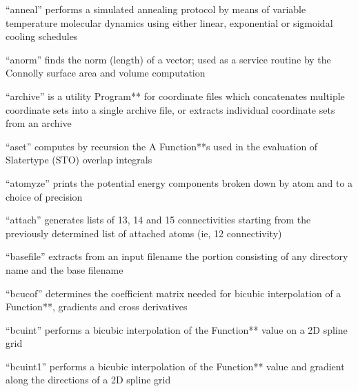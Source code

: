 \documentclass[letterpaper,11pt,english]{sphinxmanual}
\begin{document}

“anneal” performs a simulated annealing protocol by means of variable temperature molecular dynamics using either linear, exponential or sigmoidal cooling schedules


“anorm” finds the norm (length) of a vector; used as a service routine by the Connolly surface area and volume computation


“archive” is a utility Program** for coordinate files which concatenates multiple coordinate sets into a single archive file, or extracts individual coordinate sets from an archive


“aset” computes by recursion the A Function**s used in the evaluation of Slater\sphinxhyphen{}type (STO) overlap integrals


“atomyze” prints the potential energy components broken down by atom and to a choice of precision


“attach” generates lists of 1\sphinxhyphen{}3, 1\sphinxhyphen{}4 and 1\sphinxhyphen{}5 connectivities starting from the previously determined list of attached atoms (ie, 1\sphinxhyphen{}2 connectivity)


“basefile” extracts from an input filename the portion consisting of any directory name and the base filename


“bcucof” determines the coefficient matrix needed for bicubic interpolation of a Function**, gradients and cross derivatives


“bcuint” performs a bicubic interpolation of the Function** value on a 2D spline grid


“bcuint1” performs a bicubic interpolation of the Function** value and gradient along the directions of a 2D spline grid

\end{document}
